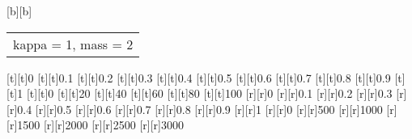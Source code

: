 %    
%
%
\begin{psfrags}%
\psfragscanon%
%
[b][b]{\color[rgb]{0,0,0}\setlength{\tabcolsep}{0pt}\begin{tabular}{c}kappa = 1, mass = 2\end{tabular}}%
%
[t][t]{0}%
[t][t]{0.1}%
[t][t]{0.2}%
[t][t]{0.3}%
[t][t]{0.4}%
[t][t]{0.5}%
[t][t]{0.6}%
[t][t]{0.7}%
[t][t]{0.8}%
[t][t]{0.9}%
[t][t]{1}%
[t][t]{0}%
[t][t]{20}%
[t][t]{40}%
[t][t]{60}%
[t][t]{80}%
[t][t]{100}%
%
[r][r]{0}%
[r][r]{0.1}%
[r][r]{0.2}%
[r][r]{0.3}%
[r][r]{0.4}%
[r][r]{0.5}%
[r][r]{0.6}%
[r][r]{0.7}%
[r][r]{0.8}%
[r][r]{0.9}%
[r][r]{1}%
[r][r]{0}%
[r][r]{500}%
[r][r]{1000}%
[r][r]{1500}%
[r][r]{2000}%
[r][r]{2500}%
[r][r]{3000}%
%
%
\end{psfrags}%
%
